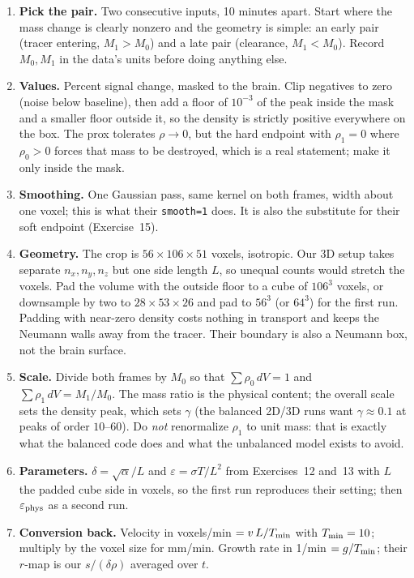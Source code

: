 \documentclass[11pt]{article}
\newcommand{\eps}{\varepsilon}
\newcommand{\code}[1]{\texttt{#1}}
\newcounter{ex}
\begin{document}
\begin{enumerate}
  \item \textbf{Pick the pair.} Two consecutive inputs, 10 minutes apart. Start where the
        mass change is clearly nonzero and the geometry is simple: an early pair (tracer
        entering, $M_1>M_0$) and a late pair (clearance, $M_1<M_0$). Record $M_0,M_1$ in the
        data's units before doing anything else.
  \item \textbf{Values.} Percent signal change, masked to the brain. Clip negatives to zero
        (noise below baseline), then add a floor of $10^{-3}$ of the peak inside the mask and a
        smaller floor outside it, so the density is strictly positive everywhere on the box.
        The prox tolerates $\rho\to0$, but the hard endpoint with $\rho_1=0$ where $\rho_0>0$
        forces that mass to be destroyed, which is a real statement; make it only inside the
        mask.
  \item \textbf{Smoothing.} One Gaussian pass, same kernel on both frames, width about one
        voxel; this is what their \code{smooth=1} does. It is also the substitute for their
        soft endpoint (Exercise~15).
  \item \textbf{Geometry.} The crop is $56\times106\times51$ voxels, isotropic. Our 3D setup
        takes separate $n_x,n_y,n_z$ but one side length $L$, so unequal counts would stretch
        the voxels. Pad the volume with the outside floor to a cube of $106^3$ voxels, or
        downsample by two to $28\times53\times26$ and pad to $56^3$ (or $64^3$) for the first
        run. Padding with near-zero density costs nothing in transport and keeps the Neumann
        walls away from the tracer. Their boundary is also a Neumann box, not the brain surface.
  \item \textbf{Scale.} Divide both frames by $M_0$ so that $\sum\rho_0\,dV=1$ and
        $\sum\rho_1\,dV=M_1/M_0$. The mass ratio is the physical content; the overall scale
        sets the density peak, which sets $\gamma$ (the balanced 2D/3D runs want
        $\gamma\approx0.1$ at peaks of order $10$--$60$). Do \emph{not} renormalize $\rho_1$ to
        unit mass: that is exactly what the balanced code does and what the unbalanced model
        exists to avoid.
  \item \textbf{Parameters.} $\delta=\sqrt\alpha/L$ and $\eps=\sigma T/L^2$ from Exercises~12
        and~13 with $L$ the padded cube side in voxels, so the first run reproduces their
        setting; then $\eps_{\rm phys}$ as a second run.
  \item \textbf{Conversion back.} Velocity in voxels/min $=v\,L/T_{\rm min}$ with
        $T_{\rm min}=10$; multiply by the voxel size for mm/min. Growth rate in 1/min $=g/T_{\rm min}$;
        their $r$-map is our $s/(\delta\rho)$ averaged over $t$.
\end{enumerate}
\end{document}

